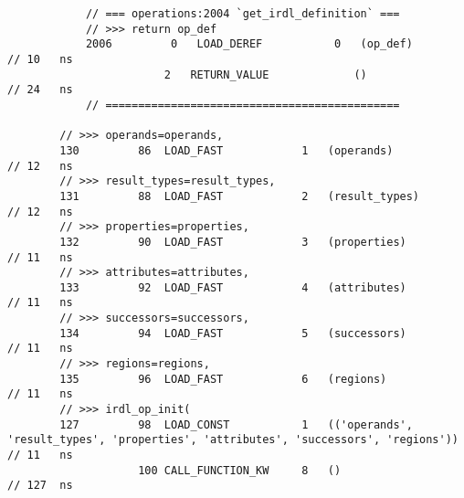 \begin{code}
\begin{verbatim}
            // === operations:2004 `get_irdl_definition` ===
            // >>> return op_def
            2006         0   LOAD_DEREF           0   (op_def)                                      // 10   ns
                        2   RETURN_VALUE             ()                                             // 24   ns
            // =============================================

        // >>> operands=operands,
        130         86  LOAD_FAST            1   (operands)                                         // 12   ns
        // >>> result_types=result_types,
        131         88  LOAD_FAST            2   (result_types)                                     // 12   ns
        // >>> properties=properties,
        132         90  LOAD_FAST            3   (properties)                                       // 11   ns
        // >>> attributes=attributes,
        133         92  LOAD_FAST            4   (attributes)                                       // 11   ns
        // >>> successors=successors,
        134         94  LOAD_FAST            5   (successors)                                       // 11   ns
        // >>> regions=regions,
        135         96  LOAD_FAST            6   (regions)                                          // 11   ns
        // >>> irdl_op_init(
        127         98  LOAD_CONST           1   (('operands', 'result_types', 'properties', 'attributes', 'successors', 'regions'))  // 11   ns
                    100 CALL_FUNCTION_KW     8   ()                                                 // 127  ns


\end{verbatim}
\end{code}
